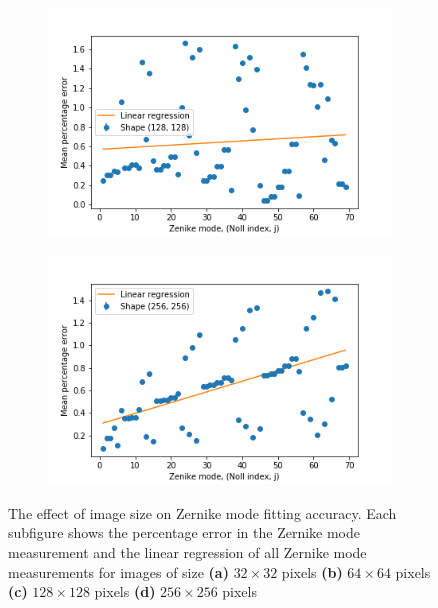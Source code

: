 \begin{figure}[h]
	\begin{subfigure}{0.48\textwidth}
		\centering
		\includegraphics[width=\linewidth]{images/Zernike_fitting_percentage_error_one_mode_128_shape.png}
		\caption{}
		\label{fig:Zernike_fitting_percentage_error_one_mode_128_shape}
	\end{subfigure}
	\begin{subfigure}{0.48\textwidth}
		\centering
		\includegraphics[width=\linewidth]{images/Zernike_fitting_percentage_error_one_mode_256_shape.png}
		\caption{}
		\label{fig:Zernike_fitting_percentage_error_one_mode_256_shape}
	\end{subfigure}
	\caption[The effect of image size on Zernike mode fitting accuracy]{The 
		effect of image size on Zernike mode fitting accuracy. Each 
		subfigure shows the percentage error in the Zernike mode 
		measurement and the linear regression of all Zernike mode 
		measurements for images of size \textbf{(a)} $32\times32$ pixels 
		\textbf{(b)} $64\times64$ pixels \textbf{(c)} $128\times128$ pixels 
		\textbf{(d)} $256\times256$ pixels}
	\label{fig:zernike_fitting_accuracy}
\end{figure}

